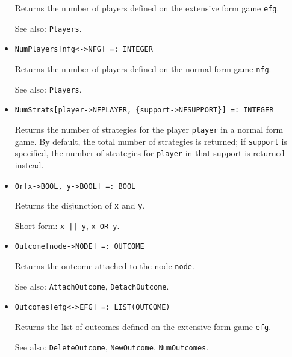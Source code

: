 \begin{itemize}
\bd
Returns the number of players defined on the extensive form
game \verb+efg+.
\item
[See also:] {\tt Players}.
\ed

\item
\protect \large \begin{verbatim}
NumPlayers[nfg<->NFG] =: INTEGER
\end{verbatim} \normalsize

\bd
Returns the number of players defined on the normal form
game \verb+nfg+.
\item
[See also:] {\tt Players}.
\ed

\item
\protect \large \begin{verbatim}
NumStrats[player->NFPLAYER, {support->NFSUPPORT}] =: INTEGER
\end{verbatim}\normalsize

\bd
Returns the number of strategies for the player \verb+player+
in a normal form game.  By default, the total number of strategies is
returned; if \verb+support+ is specified, the number of strategies
for \verb+player+ in that support is returned instead.
\ed


\item 
\protect \large \begin{verbatim}
Or[x->BOOL, y->BOOL] =: BOOL
\end{verbatim} \normalsize
  
\bd
Returns the disjunction of \verb+x+ and \verb+y+.
\item
[Short form:] \verb+x || y+, \verb+x OR y+.
\ed

\item
\protect \large \begin{verbatim}
Outcome[node->NODE] =: OUTCOME
\end{verbatim}\normalsize

\bd
Returns the outcome attached to the node \verb+node+.
\item
[See also:] {\tt AttachOutcome}, {\tt DetachOutcome}.
\ed

\item
\protect \large \begin{verbatim}
Outcomes[efg<->EFG] =: LIST(OUTCOME)
\end{verbatim}\normalsize

\bd
Returns the list of outcomes defined on the extensive form
game \verb+efg+.
\item
[See also:] {\tt DeleteOutcome}, {\tt NewOutcome}, {\tt NumOutcomes}.
\ed


\end{itemize}
